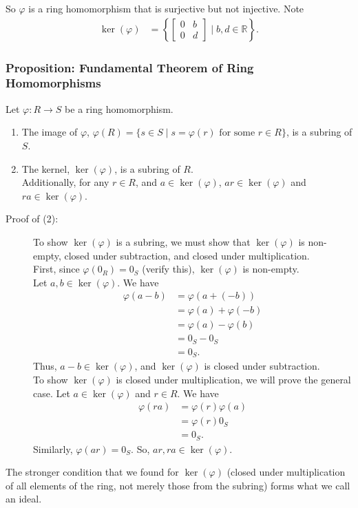 \documentclass[10pt]{extarticle}
\newcommand{\R}{\mathbb{R}}
\begin{document}
  So $\varphi$ is a ring homomorphism that is surjective but not injective. Note
  \begin{align*}
    \ker(\varphi) &= \left\{ \begin{bmatrix}0&b\\0&d\end{bmatrix}\mid b,d\in\R\right\}.
  \end{align*}
  \subsubsection{Proposition: Fundamental Theorem of Ring Homomorphisms}%
  Let $\varphi: R\rightarrow S$ be a ring homomorphism.
  \begin{enumerate}[(1)]
    \item The image of $\varphi$, $\varphi(R) = \{s\in S\mid s = \varphi(r)\text{ for some }r\in R\}$, is a subring of $S$.
    \item The kernel, $\ker(\varphi)$, is a subring of $R$.\\

      Additionally, for any $r\in R$, and $a\in \ker(\varphi)$, $ar\in \ker(\varphi)$ and $ra\in \ker(\varphi)$.
  \end{enumerate}
  \begin{description}
    \item[Proof of (2):] To show $\ker(\varphi)$ is a subring, we must show that $\ker(\varphi)$ is non-empty, closed under subtraction, and closed under multiplication.\\

      First, since $\varphi(0_R) = 0_S$ (verify this), $\ker(\varphi)$ is non-empty.\\

      Let $a,b\in\ker(\varphi)$. We have
      \begin{align*}
        \varphi(a-b) &= \varphi(a + (-b))\\
                     &= \varphi(a) + \varphi(-b)\\
                     &= \varphi(a)-\varphi(b) \tag*{check $\varphi(-b) = -\varphi(b)$}\\
                     &= 0_S - 0_S\\
                     &= 0_S.
      \end{align*}
      Thus, $a-b\in\ker(\varphi)$, and $\ker(\varphi)$ is closed under subtraction.\\

      To show $\ker(\varphi)$ is closed under multiplication, we will prove the general case. Let $a\in\ker(\varphi)$ and $r\in R$. We have
      \begin{align*}
        \varphi(ra) &= \varphi(r)\varphi(a)\\
                    &= \varphi(r)0_S\\
                    &= 0_S.
      \end{align*}
      Similarly, $\varphi(ar) = 0_S$. So, $ar,ra\in\ker(\varphi)$.
  \end{description}
  The stronger condition that we found for $\ker(\varphi)$ (closed under multiplication of all elements of the ring, not merely those from the subring) forms what we call an ideal.
\end{document}
